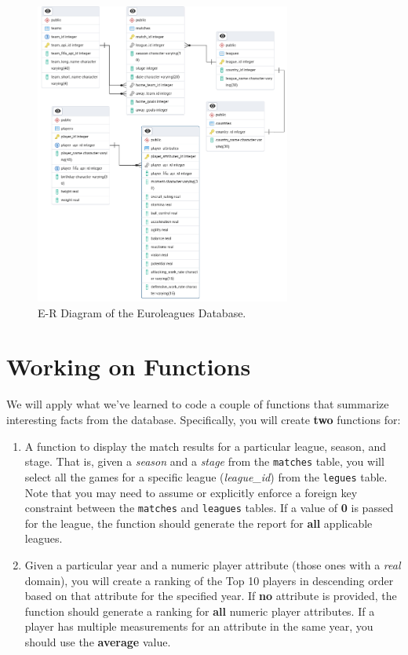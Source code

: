 \documentclass{article}
\begin{document}
\begin{figure}
 \centering
 \includegraphics[width=0.75\textwidth]{figures/Euroleagues_erd.jpg}
 \caption{E-R Diagram of the Euroleagues Database.}
 \label{fig:erd}
\end{figure}

\section{Working on Functions}
We will apply what we’ve learned to code a couple of functions that summarize interesting facts from the database. Specifically, you will create \textbf{two} functions for:

\begin{enumerate}
    \item A function to display the match results for a particular league, season, and stage. That is, given a \textit{season} and a \textit{stage} from the \texttt{matches} table, you will select all the games for a specific league (\textit{league\_id}) from the \texttt{legues} table. Note that you may need to assume or explicitly enforce a foreign key constraint between the \texttt{matches} and \texttt{leagues} tables. If a value of \textbf{0} is passed for the league, the function should generate the report for \textbf{all} applicable leagues.

    \item Given a particular year and a numeric player attribute (those ones with a \textit{real} domain), you will create a ranking of the Top 10 players in descending order based on that attribute for the specified year. If \textbf{no} attribute is provided, the function should generate a ranking for \textbf{all} numeric player attributes.  If a player has multiple measurements for an attribute in the same year, you should use the \textbf{average} value.
\end{enumerate}
\end{document}
